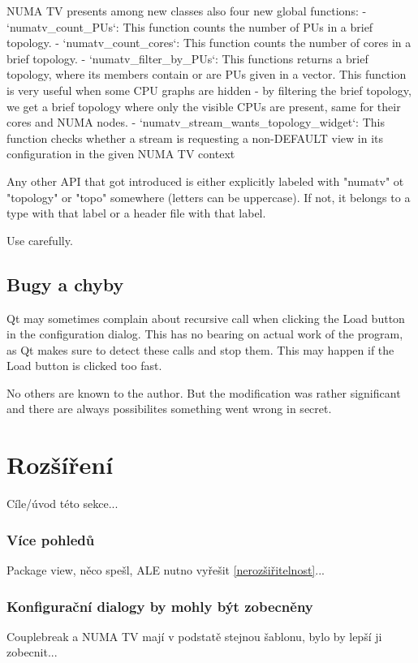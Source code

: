 \begin{code}
NUMA TV presents among new classes also four new global functions:
- `numatv_count_PUs`: This function counts the number of PUs in a brief topology.
- `numatv_count_cores`: This function counts the number of cores in a brief topology.
- `numatv_filter_by_PUs`: This functions returns a brief topology, where its members contain or
  are PUs given in a vector. This function is very useful when some CPU graphs are hidden - by
  filtering the brief topology, we get a brief topology where only the visible CPUs are present,
  same for their cores and NUMA nodes.
- `numatv_stream_wants_topology_widget`: This function checks whether a stream is requesting a
  non-DEFAULT view in its configuration in the given NUMA TV context

Any other API that got introduced is either explicitly labeled with "numatv" ot "topology" or "topo"
somewhere (letters can be uppercase). If not, it belongs to a type with that label or a header
file with that label.

Use carefully.

\subsection{Bugy a chyby}

Qt may sometimes complain about recursive call when clicking the Load button in the configuration dialog. This has no bearing
on actual work of the program, as Qt makes sure to detect these calls and stop them. This may happen if the Load button
is clicked too fast.

No others are known to the author. But the modification was rather significant and there are always possibilites something
went wrong in secret.
\end{code}

\section{Rozšíření}
Cíle/úvod této sekce...

\subsubsection*{Více pohledů}
Package view, něco spešl, ALE nutno vyřešit \ref{nerozšiřitelnost}...

\subsubsection*{Konfigurační dialogy by mohly být zobecněny}
Couplebreak a NUMA TV mají v podstatě stejnou šablonu, bylo by lepší ji zobecnit...

